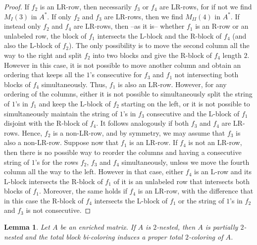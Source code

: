 \documentclass[12pt]{book}
\theoremstyle{plain}
\newtheorem{lema}[teo]{Lemma}
\theoremstyle{remark}
\begin{document}
\begin{proof}
If $f_2$ is an LR-row, then necessarily $f_3$ or $f_4$ are LR-rows, for if not we find $M_I(3)$ in $A^*$.
If only $f_2$ and $f_3$ are LR-rows, then we find $M_{II}(4)$ in $A^*$.
If instead only $f_2$ and $f_4$ are LR-rows, then --as it is-- whether $f_1$ is an R-row or an unlabeled row, the block of $f_1$ intersects the L-block and the R-block of $f_4$ (and also the L-block of $f_2$). The only possibility is to move the second column all the way to the right and split $f_2$ into two blocks and give the R-block of $f_4$ length $2$. However in this case, it is not possible to move another column and obtain an ordering that keeps all the $1$'s consecutive for $f_3$ and $f_1$ not intersecting both blocks of $f_4$ simultaneously. Thus, $f_1$ is also an LR-row. However, for any ordering of the columns, either it is not possible to simultaneously split the string of $1$'s in $f_1$ and keep the L-block of $f_2$ starting on the left, or it is not possible to simultaneously maintain the string of $1$'s in $f_3$ consecutive and the L-block of $f_1$ disjoint with the R-block of $f_4$. 
It follows analogously if both $f_3$ and $f_4$ are LR-rows. 
Hence, $f_2$ is a non-LR-row, and by symmetry, we may assume that $f_3$ is also a non-LR-row. Suppose now that $f_1$ is an LR-row. If $f_4$ is not an LR-row, then there is no possible way to reorder the columns and having a consecutive string of $1$'s for the rows $f_2$, $f_3$ and $f_4$ simultaneously, unless we move the fourth column all the way to the left. However in that case, either $f_4$ is an L-row and its L-block intersects the R-block of $f_1$ of it is an unlabeled row that intersects both blocks of $f_1$. Moreover, the same holds if $f_4$ is an LR-row, with the difference that in this case the R-block of $f_4$ intersects the L-block of $f_1$ or the string of $1$'s in $f_2$ and $f_3$ is not consecutive. 

\end{proof}

\begin{lema} \label{lema:2-nested_onlyif}
	Let $A$ be an enriched matrix. If $A$ is $2$-nested, then $A$ is partially $2$-nested and the total block bi-coloring induces a proper total $2$-coloring of $A$.
\end{lema}
\end{document}
